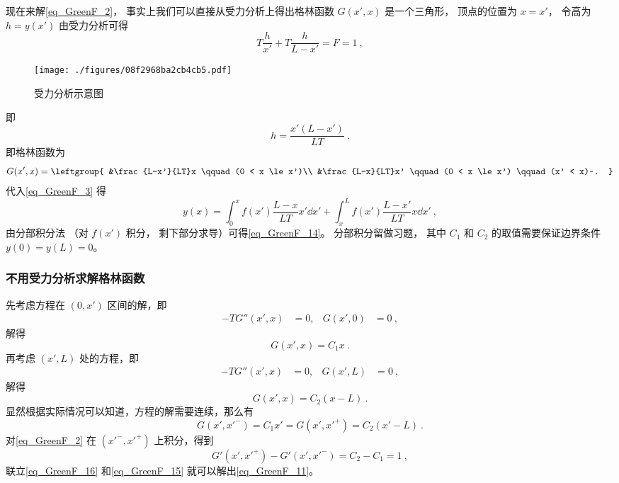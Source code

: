现在来解\autoref{eq_GreenF_2}， 事实上我们可以直接从受力分析上得出格林函数 $G(x', x)$ 是一个三角形， 顶点的位置为 $x = x'$， 令高为 $h = y(x')$ 由受力分析可得
\begin{equation}
T\frac{h}{x'} + T\frac{h}{L - x'} = F = 1~,
\end{equation}
\begin{figure}[ht]
\centering
\texttt{[image: ./figures/08f2968ba2cb4cb5.pdf]}
\caption{受力分析示意图} \label{fig_GreenF_1}
\end{figure}
即
\begin{equation}\label{eq_GreenF_11}
h = \frac{x' (L - x')}{LT}~.
\end{equation}
即格林函数为
\begin{equation}
G(x', x) = \leftgroup{
&\frac{L-x'}{LT}x \qquad (0 < x \le x')\\
&\frac{L-x}{LT}x' \qquad (0 < x \le x') \qquad (x' < x)~.
}\end{equation}
代入\autoref{eq_GreenF_3} 得
\begin{equation}\label{eq_GreenF_12}
y(x) = \int_0^x f(x') \frac{L-x}{LT}x'\dd{x'} + \int_x^L f(x')\frac{L-x'}{LT}x \dd{x'}~,
\end{equation}
由分部积分法 （对 $f(x')$ 积分， 剩下部分求导）可得\autoref{eq_GreenF_14}。 分部积分留做习题， 其中 $C_1$ 和 $C_2$ 的取值需要保证边界条件 $y(0) = y(L) = 0$。

\subsubsection{不用受力分析求解格林函数}

先考虑方程在 $(0,x')$ 区间的解，即
\begin{align}
-TG''(x',x) &=0,&
G(x',0)&=0~,
\end{align}
解得
\begin{equation}
G(x',x)=C_1 x~.
\end{equation}
再考虑 $(x',L)$ 处的方程，即
\begin{align}
-TG''(x',x) &= 0,&
G(x',L) &= 0~,
\end{align}
解得
\begin{equation}
G(x',x) = C_2 (x-L)~.
\end{equation}
显然根据实际情况可以知道，方程的解需要连续，那么有
\begin{equation}
G(x',x'^-) = C_1x' = G(x',x'^+) = C_2 (x'-L)
\label{eq_GreenF_16}~.
\end{equation}
对\autoref{eq_GreenF_2} 在 $(x'^-,x'^+)$ 上积分，得到
\begin{equation}
G'(x',x'^+)-G'(x',x'^-)=C_2-C_1=1
\label{eq_GreenF_15}~,
\end{equation}
联立\autoref{eq_GreenF_16} 和\autoref{eq_GreenF_15} 就可以解出\autoref{eq_GreenF_11}。


